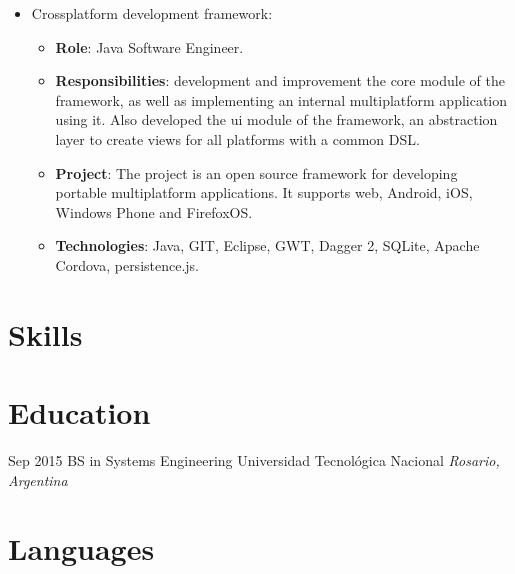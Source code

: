 \documentclass[11pt,a4paper,sans]{moderncv}        %
\begin{document}
\vspace{10mm}

  {
    \begin{itemize}
      \item Crossplatform development framework:
        \begin{itemize}
          \item \textbf{Role}: Java Software Engineer. 
          \item \textbf{Responsibilities}: development and improvement the core module of the framework, as well as
implementing an internal multiplatform application using it. Also developed the ui module of the framework, an abstraction layer to create views for all platforms with a common DSL.
          \item \textbf{Project}: The project is an open source framework for developing portable multiplatform applications. It supports web, Android, iOS, Windows Phone and FirefoxOS.
          \item \textbf{Technologies}: Java, GIT, Eclipse, GWT, Dagger 2, SQLite, Apache Cordova, persistence.js.
        \end{itemize}
    \end{itemize}
  }


\section{Skills}

\section{Education}
\cventry
{Sep 2015}
{BS in Systems Engineering}
{Universidad Tecnológica Nacional}
{}
{\textit{Rosario, Argentina}}
{}
\vspace{1mm}

\section{Languages}

\vspace{1mm}

\end{document}
